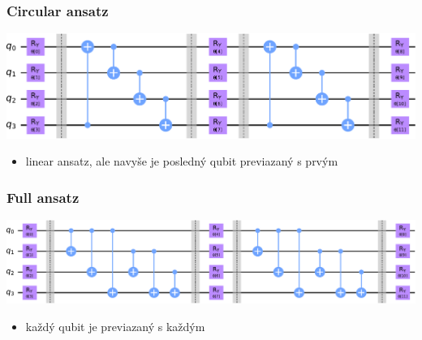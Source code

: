 \documentclass{beamer}
\begin{document}
\begin{frame}
    \frametitle{Circular ansatz}
	\includegraphics[width=1\textwidth]{ansatz-circular.pdf}
    \begin{itemize}
        \item linear ansatz, ale navyše je posledný qubit previazaný s prvým
    \end{itemize}
\end{frame}


\begin{frame}
    \frametitle{Full ansatz}
	\includegraphics[width=1\textwidth]{ansatz-full.pdf}
    \begin{itemize}
        \item každý qubit je previazaný s každým
    \end{itemize}
\end{frame}

\end{document}
